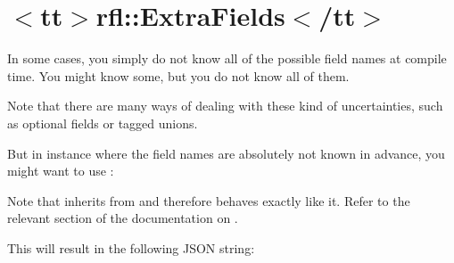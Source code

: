 \chapter{\texorpdfstring{$<$}{<}tt\texorpdfstring{$>$}{>}rfl\+::Extra\+Fields\texorpdfstring{$<$}{<}/tt\texorpdfstring{$>$}{>}}
\hypertarget{md_external_2reflect-cpp_2docs_2extra__fields}{}\label{md_external_2reflect-cpp_2docs_2extra__fields}
\label{md_external_2reflect-cpp_2docs_2extra__fields_autotoc_md576}%
%


In some cases, you simply do not know all of the possible field names at compile time. You might know some, but you do not know all of them.

Note that there are many ways of dealing with these kind of uncertainties, such as optional fields or tagged unions.

But in instance where the field names are absolutely not known in advance, you might want to use {\ttfamily {}}\+:


\begin{DoxyCode}{0}
\DoxyCodeLine{\};}
\DoxyCodeLine{}
\DoxyCodeLine{}

\end{DoxyCode}


Note that {\ttfamily {}} inherits from {\ttfamily {}} and therefore behaves exactly like it. Refer to the relevant section of the documentation on {\ttfamily {}}.

This will result in the following JSON string\+:



